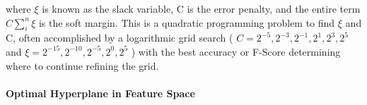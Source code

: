 			where $\xi$ is known as the slack variable, C is the error penalty, and the entire term $C\sum_i^n{\xi}$ is the soft margin.  This is a quadratic programming problem to find $\xi$ and C, often accomplished by a logarithmic grid search ( $C = { 2^{-5}, 2^{-3}, 2^{-1}, 2^1, 2^3, 2^5}$ and $\xi = {2^{-15}, 2^{-10}, 2^{-5}, 2^ 0, 2^5}$ ) with the best accuracy or F-Score determining where to continue refining the grid.





			\paragraph{Optimal Hyperplane in Feature Space}
